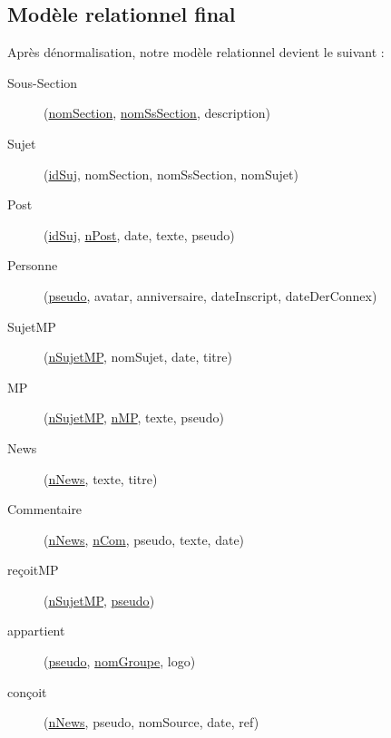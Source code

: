 \subsection{Modèle relationnel final}
Après dénormalisation, notre modèle relationnel devient le suivant :
\begin{description}
	\item[Sous-Section] (\underline{nomSection}, \underline{nomSsSection}, description)
	\item[Sujet] (\underline{idSuj}, nomSection, nomSsSection, nomSujet)
	\item[Post] (\underline{idSuj}, \underline{n\degree Post}, date, texte, pseudo)
	\item[Personne] (\underline{pseudo}, avatar, anniversaire, dateInscript, dateDerConnex)
	\item[SujetMP] (\underline{n\degree SujetMP}, nomSujet, date, titre)
	\item[MP] (\underline{n\degree SujetMP}, \underline{n\degree MP}, texte, pseudo)
	\item[News] (\underline{n\degree News}, texte, titre)
	\item[Commentaire] (\underline{n\degree News}, \underline{n\degree Com}, pseudo, texte, date)
	\item[reçoitMP] (\underline{n\degree SujetMP}, \underline{pseudo})
	\item[appartient] (\underline{pseudo}, \underline{nomGroupe}, logo)
	\item[conçoit] (\underline{n\degree News}, pseudo, nomSource, date, ref)
\end{description}


